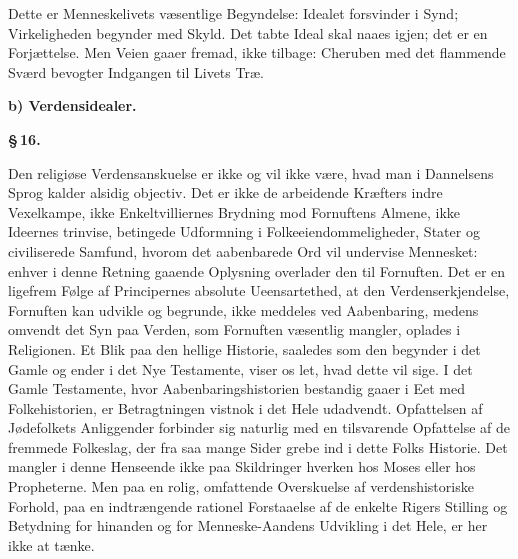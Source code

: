 \documentclass[12pt]{book}
\newcommand{\parmark}[1]{\begin{center}{\bfseries \S\,#1.}\end{center}}
\newcommand{\runhead}[1]{%
  \medskip\begin{center}{\bfseries #1}\end{center}\medskip}
\begin{document}
Dette er Menneskelivets væsentlige Begyndelse: Idealet forsvinder i
Synd; Virkeligheden begynder med Skyld. Det tabte Ideal skal naaes
igjen; det er en Forjættelse. Men Veien gaaer fremad, ikke tilbage:
Cheruben med det flammende Sværd bevogter Indgangen til Livets Træ.

\runhead{b) Verdensidealer.}
\parmark{16}

Den religiøse Verdensanskuelse er ikke og vil ikke være, hvad man i
Dannelsens Sprog kalder alsidig objectiv. Det er ikke de arbeidende
Kræfters indre Vexelkampe, ikke Enkeltvilliernes Brydning mod
Fornuftens Almene, ikke Ideernes trinvise, betingede Udformning i
Folkeeiendommeligheder, Stater og civiliserede Samfund, hvorom det
aabenbarede Ord vil undervise Mennesket: enhver i denne Retning
gaaende Oplysning overlader den til Fornuften. Det er en ligefrem
Følge af Principernes absolute Ueensartethed, at den
Verdenserkjendelse,
Fornuften kan udvikle og begrunde, ikke meddeles ved Aabenbaring,
medens omvendt det Syn paa Verden, som Fornuften væsentlig mangler,
oplades i Religionen. Et Blik paa den hellige Historie, saaledes som
den begynder i det Gamle og ender i det Nye Testamente, viser os
let, hvad dette vil sige. I det Gamle Testamente, hvor
Aabenbaringshistorien bestandig gaaer i Eet med Folkehistorien, er
Betragtningen vistnok i det Hele udadvendt. Opfattelsen af
Jødefolkets Anliggender forbinder sig naturlig med en tilsvarende
Opfattelse af de fremmede Folkeslag, der fra saa mange Sider grebe
ind i dette Folks Historie. Det mangler i denne Henseende ikke paa
Skildringer hverken hos Moses eller hos Propheterne. Men paa en
rolig, omfattende Overskuelse af verdenshistoriske Forhold, paa en
indtrængende rationel Forstaaelse af de enkelte Rigers Stilling og
Betydning for hinanden og for Menneske-Aandens Udvikling i det Hele,
er her ikke at tænke.
\end{document}
